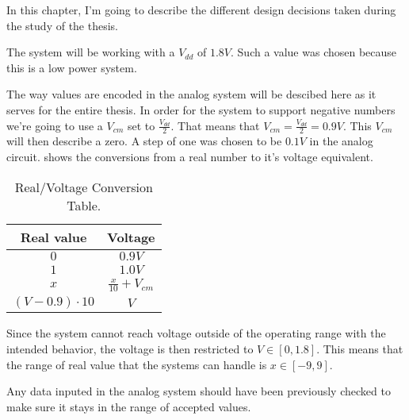 
\label{cap:design}

In this chapter, I'm going to describe the different design decisions taken during the study of the thesis.

The system will be working with a $V_{dd}$ of $1.8V$. Such a value was chosen because this is a low power system.

The way values are encoded in the analog system will be descibed here as it serves for the entire thesis.
In order for the system to support negative numbers we're going to use a $V_{cm}$ set to $\frac{V_{dd}}{2}$. That means that $V_{cm}=\frac{V_{dd}}{2}=0.9V$. This $V_{cm}$ will then describe a zero. A step of one was chosen to be $0.1V$ in the analog circuit.
 shows the conversions from a real number to it's voltage equivalent.

\begin{table}[H]
  \centering
  \begin{tabular}{|c|c|}
    \hline
    \rowcolor{gray}
    Real value & Voltage \\
    \hline
    $0$ & $0.9V$ \\
    \hline
    $1$ & $1.0V$ \\
    \hline
    $x$ & $\frac{x}{10}+V_{cm}$\\
    \hline
    $(V-0.9)\cdot 10$ & $V$\\
    \hline
  \end{tabular}
  \caption{Real/Voltage Conversion Table.}
  \label{tab:valConv}
\end{table}

Since the system cannot reach voltage outside of the operating range with the intended behavior, the voltage is then restricted to $V\in [0,1.8]$. This means that the range of real value that the systems can handle is $x\in [-9,9]$.

Any data inputed in the analog system should have been previously checked to make sure it stays in the range of accepted values.










\cleardoublepage
